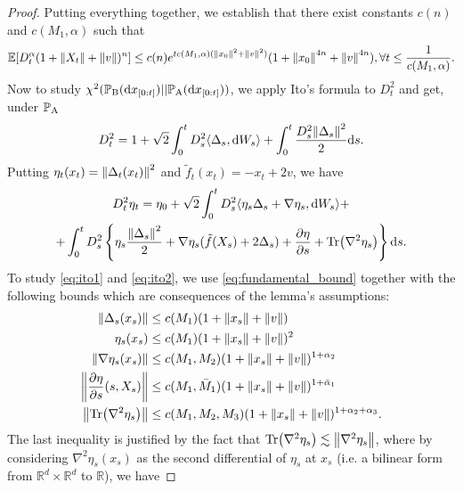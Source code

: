 \documentclass{article}
\theoremstyle{plain}
\theoremstyle{definition}
\theoremstyle{remark}
\begin{document}
\begin{proof}
	Putting everything together, we establish that there exist constants $c(n)$ and $c(M_1, \alpha)$ such that
	\begin{equation}
		\label{eq:fundamental_bound}
		\E[D_t^\alpha \polynormterm] \leq c(n)e^{tc(M_1, \alpha) (\norm{x_0}^2 + \norm{v}^2)} (1 + \norm{x_0}^{4n} + \norm{v}^{4n}), \forall t \leq \frac{1}{c(M_1, \alpha)}.
	\end{equation}
	Now to study $\chisquared{\xbzt}{\xazt}$, we apply Ito's formula to $D_t^2$ and get, under $\P_{\operatorname{A}}$
	\begin{equation}
		\label{eq:ito1}
		D_t^2 = 1 + \sqrt 2 \int_0^t D_s^2 \spito{\Delta_s}{\dd W_s} + \int_0^t \frac{D_s^2 \norm{\Delta_s}^2}{2} \dd s.
	\end{equation}
	Putting $\eta_t(x_t) = \norm{\Delta_t(x_t)}^2$ and $\tilde f_t(x_t) = - x_t + 2v$, we have
	\begin{multline}
		\label{eq:ito2}
		D_t^2 \eta_t = \eta_0 + \sqrt 2 \int_0^t D_s^2\spito{\eta_s \Delta_s + \nabla \eta_s}{\dd W_s} + \\
		+ \int_0^t D_s^2 \px{\eta_s \frac{\norm{\Delta_s}^2}{2} + \nabla \eta_s(\tilde f(X_s) + 2 \Delta_s) + \frac{\partial \eta}{\partial s} + \Tr(\nabla^2 \eta_s)} \dd s.
	\end{multline}
	To study \eqref{eq:ito1} and \eqref{eq:ito2}, we use \eqref{eq:fundamental_bound} together with the following bounds which are consequences of the lemma's assumptions:
	\begin{align*}
		\norm{\Delta_s(x_s)}                           & \leq c(M_1)(1 + \norm{x_s} + \norm{v})                                       \\
		\eta_s(x_s)                                    & \leq c(M_1) (1 + \norm{x_s} + \norm{v})^2                                    \\
		\norm{\nabla \eta_s(x_s)}                      & \leq c(M_1, M_2) (1 + \norm{x_s} + \norm{v})^{1 + \alpha_2}                  \\
		\norm{\frac{\partial\eta}{\partial s}(s, X_s)} & \leq c(M_1, \bar M_1)(1 + \norm{x_s} + \norm{v})^{1 + \bar \alpha_1}         \\
		\norm{\Tr(\nabla^2 \eta_s)}                    & \leq c(M_1, M_2, M_3) (1 + \norm{x_s} + \norm{v})^{1 + \alpha_2 + \alpha_3}.
	\end{align*}
	The last inequality is justified by the fact that $\Tr(\nabla^2 \eta_s) \lesssim \norm{\nabla^2 \eta_s}$, where by considering $\nabla^2 \eta_s(x_s)$ as the second differential of $\eta_s$ at $x_s$ (i.e. a bilinear form from $\mathbb R^d \times \mathbb R^d$ to $\mathbb R$), we have

\end{proof}
\end{document}
